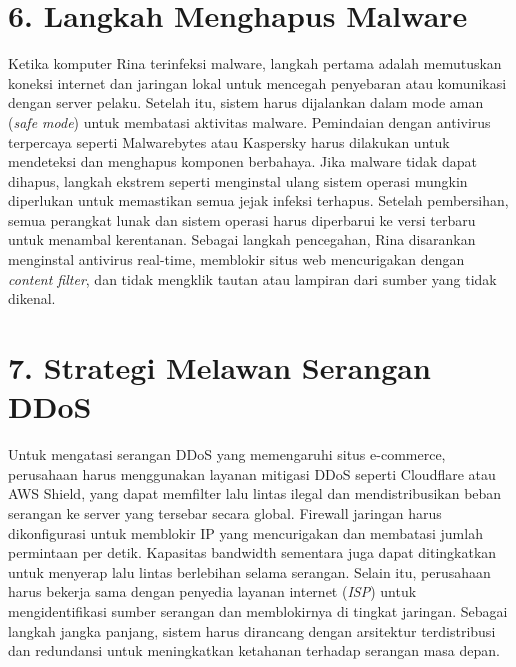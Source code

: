 \documentclass{article}
\begin{document}
\section*{6. Langkah Menghapus Malware}
Ketika komputer Rina terinfeksi malware, langkah pertama adalah memutuskan koneksi internet dan jaringan lokal untuk mencegah penyebaran atau komunikasi dengan server pelaku. Setelah itu, sistem harus dijalankan dalam mode aman (\textit{safe mode}) untuk membatasi aktivitas malware. Pemindaian dengan antivirus terpercaya seperti Malwarebytes atau Kaspersky harus dilakukan untuk mendeteksi dan menghapus komponen berbahaya. Jika malware tidak dapat dihapus, langkah ekstrem seperti menginstal ulang sistem operasi mungkin diperlukan untuk memastikan semua jejak infeksi terhapus. Setelah pembersihan, semua perangkat lunak dan sistem operasi harus diperbarui ke versi terbaru untuk menambal kerentanan. Sebagai langkah pencegahan, Rina disarankan menginstal antivirus real-time, memblokir situs web mencurigakan dengan \textit{content filter}, dan tidak mengklik tautan atau lampiran dari sumber yang tidak dikenal.

\section*{7. Strategi Melawan Serangan DDoS}
Untuk mengatasi serangan DDoS yang memengaruhi situs e-commerce, perusahaan harus menggunakan layanan mitigasi DDoS seperti Cloudflare atau AWS Shield, yang dapat memfilter lalu lintas ilegal dan mendistribusikan beban serangan ke server yang tersebar secara global. Firewall jaringan harus dikonfigurasi untuk memblokir IP yang mencurigakan dan membatasi jumlah permintaan per detik. Kapasitas bandwidth sementara juga dapat ditingkatkan untuk menyerap lalu lintas berlebihan selama serangan. Selain itu, perusahaan harus bekerja sama dengan penyedia layanan internet (\textit{ISP}) untuk mengidentifikasi sumber serangan dan memblokirnya di tingkat jaringan. Sebagai langkah jangka panjang, sistem harus dirancang dengan arsitektur terdistribusi dan redundansi untuk meningkatkan ketahanan terhadap serangan masa depan.
\end{document}
